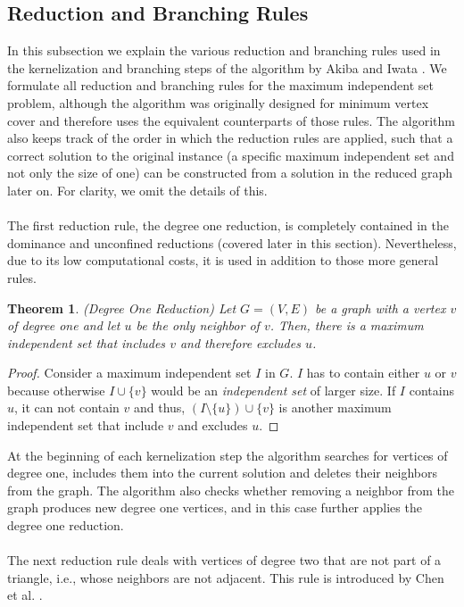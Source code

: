 \documentclass[12pt,a4paper,twoside]{scrartcl}
\newtheorem{theorem}{Theorem}
\numberwithin{equation}{section}
\begin{document}
\subsection{Reduction and Branching Rules} \label{red}

In this subsection we explain the various reduction and branching rules used in the kernelization and branching steps of the algorithm by Akiba and Iwata \cite{AkibaIwata}. We formulate all reduction and branching rules for the maximum independent set problem, although the algorithm was originally designed for minimum vertex cover and therefore uses the equivalent counterparts of those rules. The algorithm also keeps track of the order in which the reduction rules are applied, such that a correct solution to the original instance (a specific maximum independent set and not only the size of one) can be constructed from a solution in the reduced graph later on. For clarity, we omit the details of this.
\paragraph{}
The first reduction rule, the degree one reduction, is completely contained in the dominance and unconfined reductions (covered later in this section). 
Nevertheless, due to its low computational costs, it is used in addition to those more general rules. 

\begin{theorem} (Degree One Reduction) Let $G=(V,E)$ be a graph with a vertex $v$ of degree one and let $u$ be the only neighbor of $v$. Then, there is a maximum independent set that includes $v$ and therefore excludes $u$.	
\end{theorem}
\begin{proof}
	Consider a maximum independent set $I$ in $G$. $I$ has to contain either $u$ or $v$ because otherwise $I\cup\{v\}$ would be an \textit{independent set} of larger size. If $I$ contains $u$, it can not contain $v$ and thus, $(I\setminus\{u\})\cup\{v\}$ is another  maximum independent set that include $v$ and excludes $u$.
\end{proof}

At the beginning of each kernelization step the algorithm searches for vertices of degree one, includes them into the current solution and deletes their neighbors from the graph. The algorithm also checks whether removing a neighbor from the graph produces new degree one vertices, and in this case further applies the degree one reduction. \paragraph{}
The next reduction rule deals with vertices of degree two that are not part of a triangle, i.e., whose neighbors are not adjacent. This rule is introduced by Chen et al. \cite{ChenDeg2}.
\end{document}
